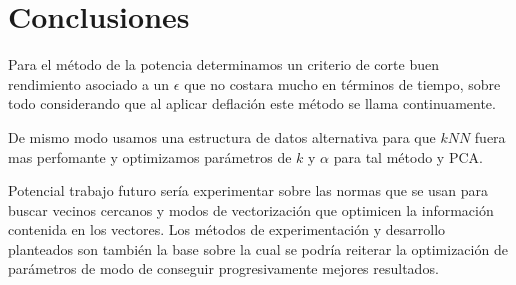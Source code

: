 \section{Conclusiones}%

Para el método de la potencia determinamos un criterio de corte buen rendimiento asociado a un $\epsilon$ que no costara mucho en términos de tiempo, sobre todo considerando que al aplicar deflación este método se llama continuamente.

De mismo modo usamos una estructura de datos alternativa para que $kNN$ fuera mas perfomante y optimizamos parámetros de $k$ y $\alpha$ para tal método y PCA.


Potencial trabajo futuro sería experimentar sobre las normas que se usan para buscar vecinos cercanos y modos de vectorización que optimicen la información contenida en los vectores. Los métodos de experimentación y desarrollo planteados son también la base sobre la cual se podría reiterar la optimización de parámetros de modo de conseguir progresivamente mejores resultados.
\label{sec:conclusiones}
